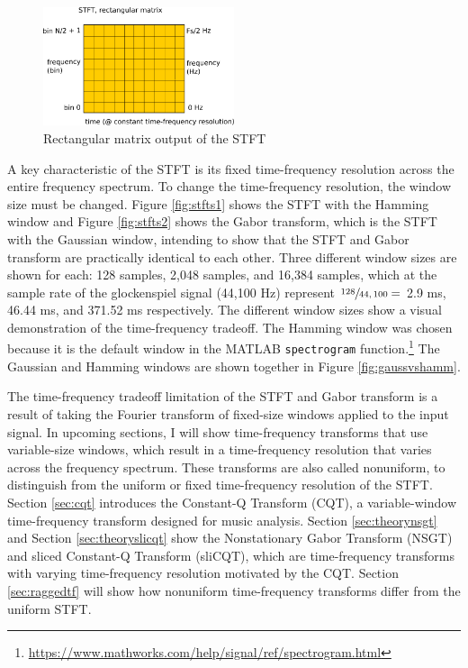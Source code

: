 \documentclass[report.tex]{subfiles}
\begin{document}
\begin{figure}[ht]
	\centering
	\includegraphics[width=0.5\textwidth]{./images-blockdiagrams/stft_diag.png}
	\caption{Rectangular matrix output of the STFT}
	\label{fig:stftdiag}
\end{figure}

A key characteristic of the STFT is its fixed time-frequency resolution across the entire frequency spectrum. To change the time-frequency resolution, the window size must be changed.  Figure \ref{fig:stfts1} shows the STFT with the Hamming window and Figure \ref{fig:stfts2} shows the Gabor transform, which is the STFT with the Gaussian window, intending to show that the STFT and Gabor transform are practically identical to each other. Three different window sizes are shown for each: 128 samples, 2,048 samples, and 16,384 samples, which at the sample rate of the glockenspiel signal (44,100 Hz) represent $\sfrac{128}{44,100} =$ 2.9 ms, 46.44 ms, and 371.52 ms respectively. The different window sizes show a visual demonstration of the time-frequency tradeoff. The Hamming window was chosen because it is the default window in the MATLAB \Verb#spectrogram# function.\footnote{\url{https://www.mathworks.com/help/signal/ref/spectrogram.html}} The Gaussian and Hamming windows are shown together in Figure \ref{fig:gaussvshamm}.

The time-frequency tradeoff limitation of the STFT and Gabor transform is a result of taking the Fourier transform of fixed-size windows applied to the input signal. In upcoming sections, I will show time-frequency transforms that use variable-size windows, which result in a time-frequency resolution that varies across the frequency spectrum. These transforms are also called nonuniform, to distinguish from the uniform or fixed time-frequency resolution of the STFT. Section \ref{sec:cqt} introduces the Constant-Q Transform (CQT), a variable-window time-frequency transform designed for music analysis. Section \ref{sec:theorynsgt} and Section \ref{sec:theoryslicqt} show the Nonstationary Gabor Transform (NSGT) and sliced Constant-Q Transform (sliCQT), which are time-frequency transforms with varying time-frequency resolution motivated by the CQT. Section \ref{sec:raggedtf} will show how nonuniform time-frequency transforms differ from the uniform STFT.
\end{document}
